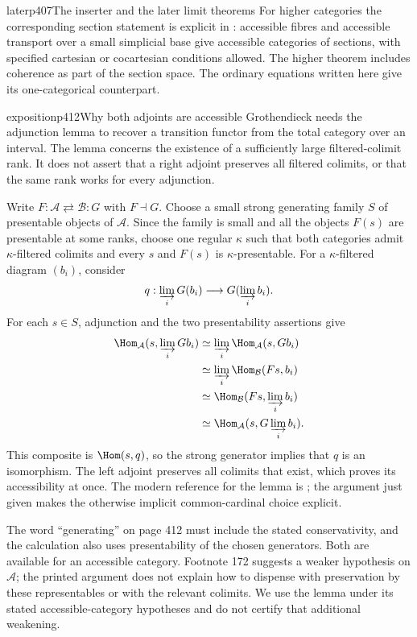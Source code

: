 \begin{dcomment}{later}{p407}{The inserter and the later limit theorems}
For higher categories the corresponding section statement is explicit in \citet[Proposition 5.4.7.11 and Remarks 5.4.7.13--14]{Lurie2009HTT}: accessible fibres and accessible transport over a small simplicial base give accessible categories of sections, with specified cartesian or cocartesian conditions allowed. The higher theorem includes coherence as part of the section space. The ordinary equations written here give its one-categorical counterpart.
\end{dcomment}

\begin{dcomment}{exposition}{p412}{Why both adjoints are accessible}
Grothendieck needs the adjunction lemma to recover a transition functor from the total category over an interval. The lemma concerns the existence of a sufficiently large filtered-colimit rank. It does not assert that a right adjoint preserves all filtered colimits, or that the same rank works for every adjunction.

Write $F:\mathcal A\rightleftarrows\mathcal B:G$ with $F\dashv G$. Choose a small strong generating family $S$ of presentable objects of $\mathcal A$. Since the family is small and all the objects $F(s)$ are presentable at some ranks, choose one regular $\kappa$ such that both categories admit $\kappa$-filtered colimits and every $s$ and $F(s)$ is $\kappa$-presentable. For a $\kappa$-filtered diagram $(b_i)$, consider
\[
 q:\varinjlim_iG(b_i)\longrightarrow G(\varinjlim_i b_i).
\]
For each $s\in S$, adjunction and the two presentability assertions give
\[
\begin{aligned}
 \Hom_{\mathcal A}(s,\varinjlim_iG b_i)
 &\simeq\varinjlim_i\Hom_{\mathcal A}(s,G b_i)\\
 &\simeq\varinjlim_i\Hom_{\mathcal B}(F s,b_i)\\
 &\simeq\Hom_{\mathcal B}(F s,\varinjlim_i b_i)\\
 &\simeq\Hom_{\mathcal A}(s,G\varinjlim_i b_i).
\end{aligned}
\]
This composite is $\Hom(s,q)$, so the strong generator implies that $q$ is an isomorphism. The left adjoint preserves all colimits that exist, which proves its accessibility at once. The modern reference for the lemma is \citet[Proposition 2.23]{AdamekRosicky1994}; the argument just given makes the otherwise implicit common-cardinal choice explicit.

The word ``generating'' on page 412 must include the stated conservativity, and the calculation also uses presentability of the chosen generators. Both are available for an accessible category. Footnote 172 suggests a weaker hypothesis on $\mathcal A$; the printed argument does not explain how to dispense with preservation by these representables or with the relevant colimits. We use the lemma under its stated accessible-category hypotheses and do not certify that additional weakening.


\end{dcomment}
